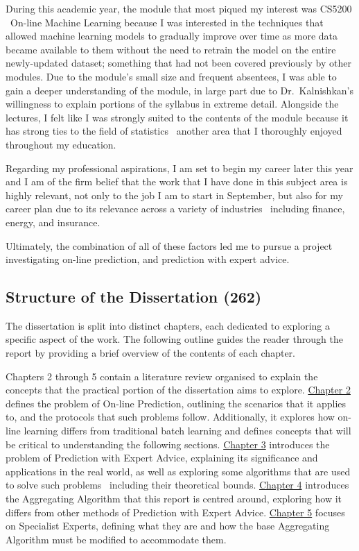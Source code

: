 During this academic year, the module that most piqued my interest was CS5200 \textendash\ On-line Machine Learning because I was interested in the techniques that allowed machine learning models to gradually improve over time as more data became available to them without the need to retrain the model on the entire newly-updated dataset; something that had not been covered previously by other modules. Due to the module's small size and frequent absentees, I was able to gain a deeper understanding of the module, in large part due to Dr.\ Kalnishkan's willingness to explain portions of the syllabus in extreme detail. Alongside the lectures, I felt like I was strongly suited to the contents of the module because it has strong ties to the field of statistics \textendash\ another area that I thoroughly enjoyed throughout my education. 

Regarding my professional aspirations, I am set to begin my career later this year and I am of the firm belief that the work that I have done in this subject area is highly relevant, not only to the job I am to start in September, but also for my career plan due to its relevance across a variety of industries \textendash\ including finance, energy, and insurance.

Ultimately, the combination of all of these factors led me to pursue a project investigating on-line prediction, and prediction with expert advice.

\subsection{Structure of the Dissertation \textbf{(262)}}
The dissertation is split into distinct chapters, each dedicated to exploring a specific aspect of the work. The following outline guides the reader through the report by providing a brief overview of the contents of each chapter.

Chapters 2 through 5 contain a literature review organised to explain the concepts that the practical portion of the dissertation aims to explore. \hyperref[section:On-line_Prediction]{Chapter 2} defines the problem of On-line Prediction, outlining the scenarios that it applies to, and the protocols that such problems follow. Additionally, it explores how on-line learning differs from traditional batch learning and defines concepts that will be critical to understanding the following sections. \hyperref[section:Prediction_with_Expert_Advice]{Chapter 3} introduces the problem of Prediction with Expert Advice, explaining its significance and applications in the real world, as well as exploring some algorithms that are used to solve such problems \textendash\ including their theoretical bounds. \hyperref[section:Aggregating_Algorithm]{Chapter 4} introduces the Aggregating Algorithm that this report is centred around, exploring how it differs from other methods of Prediction with Expert Advice. \hyperref[section:Specialist_Experts]{Chapter 5} focuses on Specialist Experts, defining what they are and how the base Aggregating Algorithm must be modified to accommodate them.

